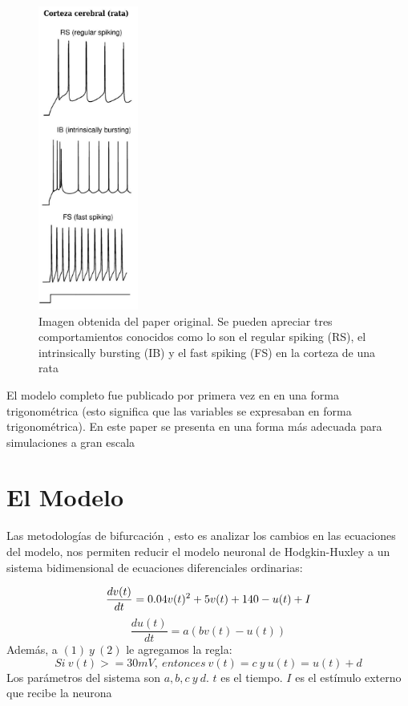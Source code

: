 \documentclass[12pt]{article}
\begin{document}
\begin{figure}
    \centering
        \includegraphics[height=10cm]{images/rata.jpg}
    \caption[fontsize=2pt]{Imagen obtenida del paper original. Se pueden apreciar tres comportamientos conocidos como lo son el regular spiking (RS), el intrinsically bursting (IB) y el fast spiking (FS) en la corteza de una rata}
\end{figure}

El modelo completo fue publicado por primera vez en \cite{modeloPrimero} en una forma trigonométrica (esto significa que las variables se expresaban en forma trigonométrica). En este paper se presenta en una forma más adecuada para simulaciones a gran escala

\section{El Modelo}
Las metodologías de bifurcación \cite{bifurcacion}, esto es analizar los cambios en las ecuaciones del modelo, nos permiten reducir el modelo neuronal de Hodgkin-Huxley a un sistema bidimensional de ecuaciones diferenciales ordinarias:

\begin{equation}
    \frac{dv(t)}{dt} = 0.04 v(t)^2 + 5 v(t) + 140 - u(t) + I\\
\end{equation}
\begin{equation}
    \frac{du(t)}{dt} = a(b v(t) - u(t))
\end{equation}
Además, a $(1) \ y  \ (2)$ le agregamos la regla:
\begin{equation}
    Si \ v(t) >= 30 mV,\ entonces \
        v(t) = c \ y \ u(t) = u(t) + d
\end{equation}
Los parámetros del sistema son $a, b, c \ y \ d$. $t$ es el tiempo. $I$ es el estímulo externo que recibe la neurona \\ \\
\end{document}
